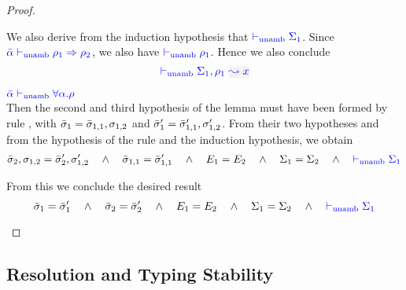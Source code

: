 \begin{proof}
\begin{description}
  We also derive from the induction hypothesis that ${\color{blue}  \vdash_{\mathrm{unamb}} \Sigma_1}$. 
  Since ${\color{blue} \bar{\alpha} \vdash_{\mathrm{unamb}} \rho_1 \Rightarrow \rho_2}$, we also have ${\color{blue}  \vdash_{\mathrm{unamb}} \rho_1}$.
  Hence we also conclude
\begin{equation*}
  \unambig{}{\Sigma_1,\ie{\rulet_1}{x}}
\end{equation*}
\item[\fbox{\rref{UA-TAbs}}]\quad${\color{blue} \bar{\alpha} \vdash_{\mathrm{unamb}} \forall \alpha.\rho}$\\

Then the second and third hypothesis of the lemma must have been formed by rule ,
  with $\bar{\sigma}_1 = \bar{\sigma}_{1,1},\sigma_{1,2}$ and $\bar{\sigma}_1' = \bar{\sigma}_{1,1}',\sigma_{1,2}'$.
  From their two hypotheses and from the hypothesis of the rule and the induction hypothesis, we obtain
\begin{equation*}
  \bar{\sigma}_2,\sigma_{1,2} = \bar{\sigma}_2',\sigma_{1,2}' 
  \quad\wedge\quad
  \bar{\sigma}_{1,1} = \bar{\sigma}_{1,1}'
  \quad\wedge\quad
  E_1 = E_2
  \quad\wedge\quad
  \Sigma_1 = \Sigma_2
  \quad\wedge\quad
  {\color{blue}  \vdash_{\mathrm{unamb}}\Sigma_1}
\end{equation*}
  
  From this we conclude the desired result 
\begin{equation*}
  \bar{\sigma}_1 = \bar{\sigma}_1' \quad\wedge\quad \bar{\sigma}_2 = \bar{\sigma}_2'
  \quad\wedge\quad
  E_1 = E_2
  \quad\wedge\quad
  \Sigma_1 = \Sigma_2
  \quad\wedge\quad
  {\color{blue}  \vdash_{\mathrm{unamb}}\Sigma_1}
\end{equation*}
\end{description}
\end{proof}

\subsection{Resolution and Typing Stability}\label{proof:coherence}

